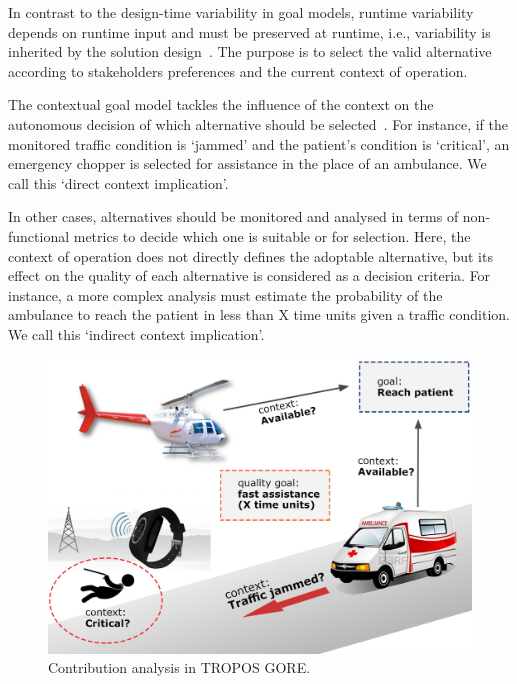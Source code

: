 In contrast to the design-time variability in goal models, runtime variability depends on runtime input and must be preserved at runtime, i.e., variability is inherited by the solution design~\cite{Yu:2008}. The purpose is to select the valid alternative according to stakeholders preferences and the current context of operation.

The contextual goal model tackles the influence of the context on the autonomous decision of which alternative should be selected~\cite{Ali:2010}. For instance, if the monitored traffic condition is `jammed' and the patient's condition is `critical', an emergency chopper is selected for assistance in the place of an ambulance. We call this  `direct context implication'.

In other cases, alternatives should be monitored and analysed in terms of non-functional metrics to decide which one is suitable or for selection. Here, the context of operation does not directly defines the adoptable alternative, but its effect on the quality of each alternative is considered as a decision criteria. For instance, a more complex analysis must estimate the probability of the ambulance to reach the patient in less than X time units given a traffic condition. We call this `indirect context implication'. 


\begin{figure}[h!]
\centering
\includegraphics[width=1\textwidth]{imgs/RUNTIME_ANALYSIS.png}
\caption{Contribution analysis in TROPOS GORE.}
\label{fig:RUNTIME_ANALYSIS}
\end{figure}

